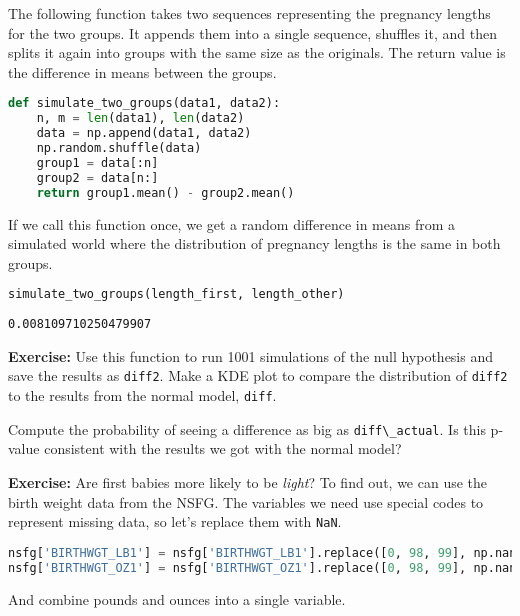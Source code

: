 The following function takes two sequences representing the pregnancy
lengths for the two groups. It appends them into a single sequence,
shuffles it, and then splits it again into groups with the same size as
the originals. The return value is the difference in means between the
groups.

\begin{lstlisting}[language=Python,style=source]
def simulate_two_groups(data1, data2):
    n, m = len(data1), len(data2)
    data = np.append(data1, data2)
    np.random.shuffle(data)
    group1 = data[:n]
    group2 = data[n:]
    return group1.mean() - group2.mean()
\end{lstlisting}

If we call this function once, we get a random difference in means from
a simulated world where the distribution of pregnancy lengths is the
same in both groups.

\begin{lstlisting}[language=Python,style=source]
simulate_two_groups(length_first, length_other)
\end{lstlisting}

\begin{lstlisting}[style=output]
0.008109710250479907
\end{lstlisting}

\textbf{Exercise:} Use this function to run 1001 simulations of the null
hypothesis and save the results as \passthrough{\lstinline!diff2!}. Make
a KDE plot to compare the distribution of
\passthrough{\lstinline!diff2!} to the results from the normal model,
\passthrough{\lstinline!diff!}.

Compute the probability of seeing a difference as big as
\passthrough{\lstinline!diff\_actual!}. Is this p-value consistent with
the results we got with the normal model?

\textbf{Exercise:} Are first babies more likely to be \emph{light}? To
find out, we can use the birth weight data from the NSFG. The variables
we need use special codes to represent missing data, so let's replace
them with \passthrough{\lstinline!NaN!}.

\begin{lstlisting}[language=Python,style=source]
nsfg['BIRTHWGT_LB1'] = nsfg['BIRTHWGT_LB1'].replace([0, 98, 99], np.nan)
nsfg['BIRTHWGT_OZ1'] = nsfg['BIRTHWGT_OZ1'].replace([0, 98, 99], np.nan)
\end{lstlisting}

And combine pounds and ounces into a single variable.

